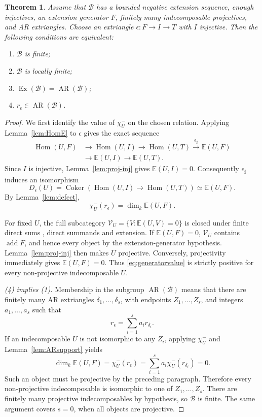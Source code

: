 \documentclass[pdflatex,sn-mathphys-num]{sn-jnl}
\numberwithin{equation}{section}
\newtheorem{theorem}{Theorem}[section]
\theoremstyle{definition}
\theoremstyle{remark}\newtheorem{remark}[theorem]{Remark}
\newcommand{\E}{\mathbb E}
\newcommand{\Hom}{\operatorname{Hom}}
\newcommand{\add}{\operatorname{add}}
\newcommand{\Ex}{\operatorname{Ex}}
\newcommand{\AR}{\operatorname{AR}}
\newcommand{\coker}{\operatorname{Coker}}
\newcommand{\dimk}{\dim_k}
\begin{document}
\begin{theorem}\label{thm:general}
Assume that $\mathcal B$ has a bounded negative extension sequence,
enough injectives, an extension generator $F$, finitely many
indecomposable projectives, and AR extriangles. Choose an extriangle
$\epsilon:F\to I\to T$ with $I$ injective. Then the following
conditions are equivalent:
\begin{enumerate}
\item $\mathcal B$ is finite;
\item $\mathcal B$ is locally finite;
\item $\Ex(\mathcal B)=\AR(\mathcal B)$;
\item $r_\epsilon\in\AR(\mathcal B)$.
\end{enumerate}
\end{theorem}
\begin{proof}
We first identify the value of $\chi^-_U$ on the chosen relation.
Applying Lemma~\ref{lem:HomE} to $\epsilon$ gives the exact sequence
\[
\begin{aligned}
 \Hom(U,F)&\longrightarrow\Hom(U,I)\longrightarrow\Hom(U,T)
 \xrightarrow{\epsilon_\sharp}\E(U,F)\\
 &\longrightarrow\E(U,I)\longrightarrow\E(U,T).
\end{aligned}
\]
Since $I$ is injective, Lemma~\ref{lem:proj-inj} gives $\E(U,I)=0$.
Consequently $\epsilon_\sharp$ induces an isomorphism
\[
 D_\epsilon(U)=\coker(\Hom(U,I)\to\Hom(U,T))\simeq\E(U,F).
\]
By Lemma~\ref{lem:defect},
\begin{equation}\label{eq:generatorvalue}
 \chi^-_U(r_\epsilon)=\dimk\E(U,F).
\end{equation}

For fixed $U$, the full subcategory
$\mathcal V_U=\{V:\E(U,V)=0\}$ is closed under finite direct sums
, direct summands and extension. If $\E(U,F)=0$,
$\mathcal V_U$ contains $\add F$, and hence every object by the
extension-generator hypothesis. Lemma~\ref{lem:proj-inj} then makes
$U$ projective. Conversely, projectivity immediately gives
$\E(U,F)=0$. Thus \eqref{eq:generatorvalue} is strictly positive
for every non-projective indecomposable $U$.

\emph{(4) implies (1).} Membership in the subgroup $\AR(\mathcal B)$
means that there are finitely many AR extriangles
$\delta_1,\ldots,\delta_s$, with endpoints $Z_1,\ldots,Z_s$, and
integers $a_1,\ldots,a_s$ such that
\[
 r_\epsilon=\sum_{i=1}^s a_i r_{\delta_i}.
\]
If an indecomposable $U$ is not isomorphic to any $Z_i$, applying
$\chi^-_U$ and Lemma~\ref{lem:ARsupport} yields
\[
 \dimk\E(U,F)=\chi^-_U(r_\epsilon)
       =\sum_{i=1}^s a_i\chi^-_U(r_{\delta_i})=0.
\]
Such an object must be projective by the preceding paragraph.
Therefore every non-projective indecomposable is isomorphic to one
of $Z_1,\ldots,Z_s$. There are finitely many projective
indecomposables by hypothesis, so $\mathcal B$ is finite. The same
argument covers $s=0$, when all objects are projective.


\end{proof}
\end{document}
